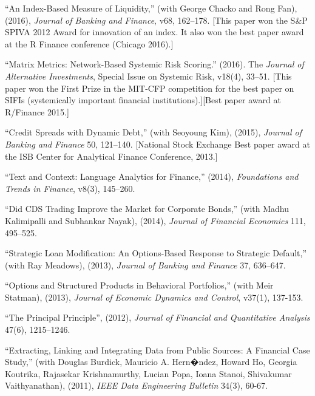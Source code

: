 \documentclass{article}
\begin{document}
\begin{etaremune}
\setlength\itemsep{-0.1em}

\item ``An Index-Based Measure of Liquidity,'' (with George Chacko and Rong Fan), (2016), {\it Journal of Banking and Finance}, v68, 162--178. [This paper won the S\&P SPIVA 2012 Award for innovation of an index. It also won the best paper award at the R Finance conference (Chicago 2016).]


\item ``Matrix Metrics: Network-Based Systemic Risk Scoring.'' (2016). The {\it Journal of Alternative Investments}, Special Issue on Systemic Risk, v18(4), 33--51. [This paper won the First Prize in the MIT-CFP competition for the best paper on SIFIs (systemically important financial institutions).][Best paper award at R/Finance 2015.]


\item ``Credit Spreads with Dynamic Debt,'' (with Seoyoung Kim), (2015), {\it Journal of Banking and Finance} 50, 121--140. [National Stock Exchange Best paper award at the ISB Center for Analytical Finance Conference, 2013.]

\item ``Text and Context: Language Analytics for Finance,'' (2014), {\it Foundations and Trends in Finance}, v8(3), 145--260. 


\item ``Did CDS Trading Improve the Market for Corporate Bonds,'' (with Madhu Kalimipalli and Subhankar Nayak), (2014), {\it Journal of Financial Economics} 111, 495--525.

\item ``Strategic Loan Modification: An Options-Based Response to Strategic Default,'' (with Ray Meadows), (2013), {\it Journal of Banking and Finance} 37, 636--647.

\item ``Options and Structured Products in Behavioral Portfolios,'' (with Meir Statman), (2013), {\it Journal of Economic Dynamics and Control}, v37(1), 137-153. 

\item ``The Principal Principle'', (2012), {\it Journal of Financial and Quantitative Analysis} 47(6), 1215--1246.  

\item ``Extracting, Linking and Integrating Data from Public Sources: A Financial Case Study,'' (with Douglas Burdick, Mauricio A. Hern�ndez, Howard Ho, Georgia Koutrika, Rajasekar Krishnamurthy, Lucian Popa, Ioana Stanoi, Shivakumar Vaithyanathan), (2011), {\it IEEE Data Engineering Bulletin} 34(3), 60-67.


\end{etaremune}
\end{document}
